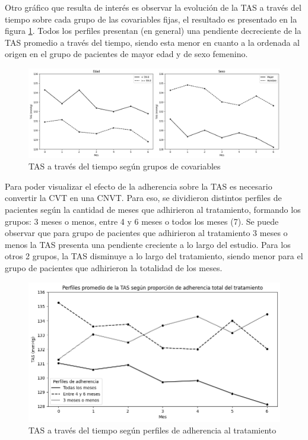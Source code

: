 \documentclass[spanish]{article}
\numberwithin{figure}{subsection}
\numberwithin{equation}{subsection}
\numberwithin{table}{subsection}
\begin{document}
Otro gráfico que resulta de interés es observar la evolución de la TAS a través
del tiempo sobre cada grupo de las covariables fijas, el resultado es presentado
en la figura \ref{TAS_with_covs}. Todos los perfiles presentan (en general) una
pendiente decreciente de la TAS promedio a través del tiempo, siendo esta menor
en cuanto a la ordenada al origen en el grupo de pacientes de mayor edad y de
sexo femenino. 

\begin{figure}[H]
	\centering
	\includegraphics[scale=0.4]{img/TAS_vs_tpo_with_covs.png}
	\caption{TAS a través del tiempo según grupos de covariables}
	\label{TAS_with_covs}
\end{figure}

Para poder visualizar el efecto de la adherencia sobre la TAS es necesario
convertir la CVT en una CNVT. Para eso, se dividieron distintos perfiles de
pacientes según la cantidad de meses que adhirieron al tratamiento, formando los
grupos: 3 meses o menos, entre 4 y 6 meses o todos los meses (7). Se puede
observar que para grupo de pacientes que adhirieron al tratamiento 3 meses o
menos la TAS presenta una pendiente creciente a lo largo del estudio. Para los
otros 2 grupos, la TAS disminuye a lo largo del tratamiento, siendo menor para
el grupo de pacientes que adhirieron la totalidad de los meses.

\begin{figure}[H]
	\centering
	\includegraphics[scale=0.5]{img/TAS_vs_tpo_with_adherencia.png}
	\caption{TAS a través del tiempo según perfiles de adherencia al tratamiento}
	\label{TAS_with_adh}
\end{figure}
\end{document}
